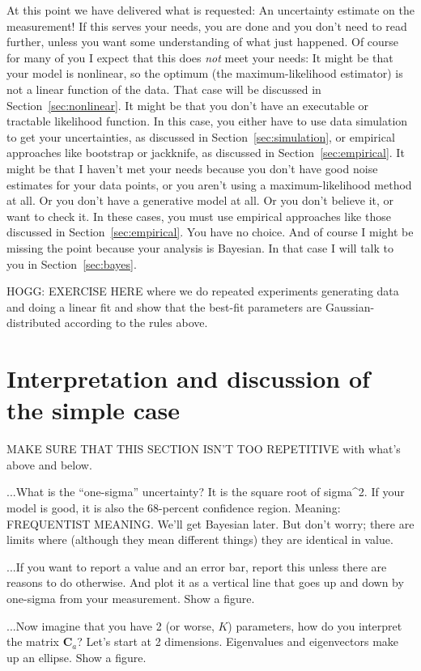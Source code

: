\documentclass[10pt]{article}
\newcommand{\sectionname}{Section}
\newcommand{\tensor}[1]{\mathbf{#1}}
\newcommand{\tC}{\tensor{C}}
\begin{document}
At this point we have delivered what is requested: An uncertainty estimate
on the measurement!
If this serves your needs, you are done and you don't need to read further,
unless you want some understanding of what just happened.
Of course for many of you I expect that this does \emph{not} meet your needs:
It might be that your model is nonlinear, so the optimum (the maximum-likelihood
estimator) is not a linear function of the data. That case will be discussed
in \sectionname~\ref{sec:nonlinear}.
It might be that you don't have an executable or tractable likelihood function.
In this case, you either have to use data simulation to get your uncertainties,
as discussed in \sectionname~\ref{sec:simulation}, or empirical approaches
like bootstrap or jackknife, as discussed in \sectionname~\ref{sec:empirical}.
It might be that I haven't met your needs because you don't have good noise
estimates for your data points, or you aren't using a maximum-likelihood method
at all. Or you don't have a generative model at all. Or you don't believe it, or
want to check it. In these cases, you must use empirical approaches like those discussed
in \sectionname~\ref{sec:empirical}. You have no choice.
And of course I might be missing the point because your analysis is Bayesian.
In that case I will talk to you in \sectionname~\ref{sec:bayes}.

HOGG: EXERCISE HERE where we do repeated experiments generating data
and doing a linear fit and show that the best-fit parameters are
Gaussian-distributed according to the rules above.

\section{Interpretation and discussion of the simple case}

MAKE SURE THAT THIS SECTION ISN'T TOO REPETITIVE with what's above and below.

...What is the ``one-sigma'' uncertainty? It is the square root of sigma^2.
If your model is good, it is also the 68-percent confidence region.
Meaning: FREQUENTIST MEANING. We'll get Bayesian later. But don't worry; there
are limits where (although they mean different things) they are identical in
value.

...If you want to report a value and an error bar, report this unless there
are reasons to do otherwise. And plot it as a vertical line that goes up and
down by one-sigma from your measurement. Show a figure.

...Now imagine that you have 2 (or worse, $K$) parameters, how do you interpret
the matrix $\tC_a$? Let's start at 2 dimensions. Eigenvalues and eigenvectors make
up an ellipse. Show a figure.
\end{document}
